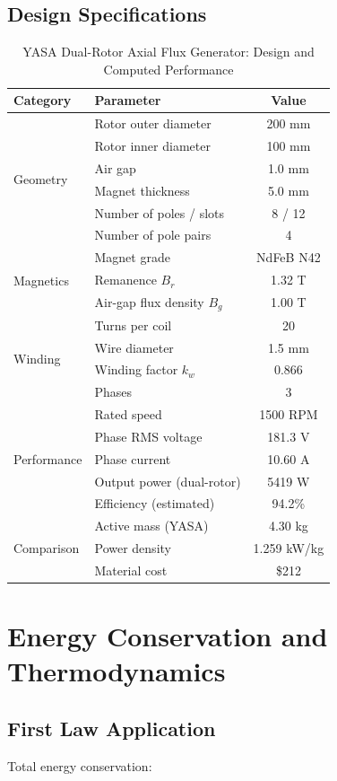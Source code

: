 \documentclass[12pt,a4paper]{article}
\begin{document}
\subsection{Design Specifications}
\begin{table}[h]
\centering
\caption{YASA Dual-Rotor Axial Flux Generator: Design and Computed Performance}
\begin{tabular}{|l|l|c|}
\hline
\textbf{Category} & \textbf{Parameter} & \textbf{Value} \\
\hline
\multirow{6}{*}{Geometry} & Rotor outer diameter & 200 mm \\
 & Rotor inner diameter & 100 mm \\
 & Air gap & 1.0 mm \\
 & Magnet thickness & 5.0 mm \\
 & Number of poles / slots & 8 / 12 \\
 & Number of pole pairs & 4 \\
\hline
\multirow{3}{*}{Magnetics} & Magnet grade & NdFeB N42 \\
 & Remanence $B_r$ & 1.32 T \\
 & Air-gap flux density $B_g$ & 1.00 T \\
\hline
\multirow{4}{*}{Winding} & Turns per coil & 20 \\
 & Wire diameter & 1.5 mm \\
 & Winding factor $k_w$ & 0.866 \\
 & Phases & 3 \\
\hline
\multirow{5}{*}{Performance} & Rated speed & 1500 RPM \\
 & Phase RMS voltage & 181.3 V \\
 & Phase current & 10.60 A \\
 & Output power (dual-rotor) & 5419 W \\
 & Efficiency (estimated) & 94.2\% \\
\hline
\multirow{3}{*}{Comparison} & Active mass (YASA) & 4.30 kg \\
 & Power density & 1.259 kW/kg \\
 & Material cost & \$212 \\
\hline
\end{tabular}
\end{table}

\section{Energy Conservation and Thermodynamics}
\subsection{First Law Application}
Total energy conservation:
\end{document}
